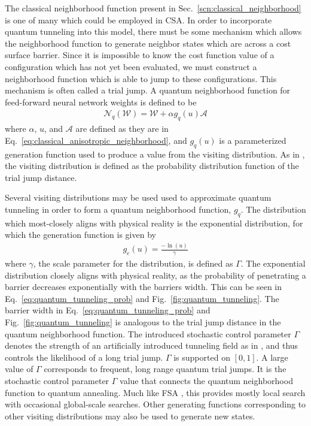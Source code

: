 \documentclass[11pt]{afthesis}
\begin{document}
	The classical neighborhood function present in Sec.~\ref{scn:classical_neighborhood} is one of many which could be employed in CSA. In order to incorporate quantum tunneling into this model, there must be some mechanism which allows the neighborhood function to generate neighbor states which are across a cost surface barrier. Since it is impossible to know the cost function value of a configuration which has not yet been evaluated, we must construct a neighborhood function which is able to jump to these configurations. This mechanism is often called a trial jump. A quantum neighborhood function for feed-forward neural network weights is defined to be
	\begin{align}\label{eq:quantum_anisotropic_neighborhood}
	\mathcal{N}_{q} (\boldsymbol{\mathcal{W}}) = \boldsymbol{\mathcal{W}} + \alpha g_{q}(u) \boldsymbol{\mathcal{A}} 
	\end{align}
	\noindent where $\alpha$, $u$, and $\boldsymbol{\mathcal{A}}$ are defined as they are in Eq.~\ref{eq:classical_anisotropic_neighborhood}, and $g_{q}(u)$ is a parameterized generation function used to produce a value from the visiting distribution. As in \cite{tsallis1996generalizedsimulatedannealing}, the visiting distribution is defined as the probability distribution function of the trial jump distance. 
	
	Several visiting distributions may be used used to approximate quantum tunneling in order to form a quantum neighborhood function, $g_{q}$. The distribution which most-closely aligns with physical reality is the exponential distribution, for which the generation function is given by
	\begin{align}\label{eq:exp_generation_fcn}
	g_{e}(u) =  \frac{-\ln(u)}{\gamma}
	\end{align}
	\noindent where $\gamma$, the scale parameter for the distribution, is defined as $\Gamma$. The exponential distribution closely aligns with physical reality, as the probability of penetrating a barrier decreases exponentially with the barriers width. This can be seen in Eq.~\ref{eq:quantum_tunneling_prob} and Fig.~\ref{fig:quantum_tunneling}. The barrier width in Eq.~\ref{eq:quantum_tunneling_prob} and Fig.~\ref{fig:quantum_tunneling} is analogous to the trial jump distance in the quantum neighborhood function. The introduced stochastic control parameter $\Gamma$ denotes the strength of an artificially introduced tunneling field as in \cite{mukherjee2015multivariatesearchqa}, and thus controls the likelihood of a long trial jump. $\Gamma$ is supported on $[0,1]$. A large value of $\Gamma$ corresponds to frequent, long range quantum trial jumps. It is the stochastic control parameter $\Gamma$ value that connects the quantum neighborhood function to quantum annealing. Much like FSA \cite{szu1987fastsimulatedannealing}, this provides mostly local search with occasional global-scale searches. Other generating functions corresponding to other visiting distributions may also be used to generate new states. 
	
\end{document}
